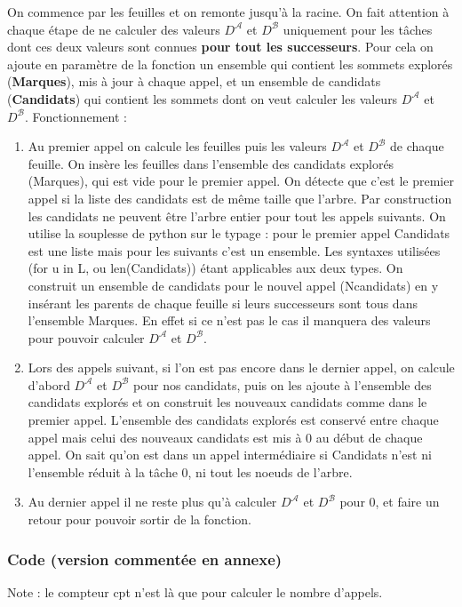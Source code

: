 \documentclass{article}
\begin{document}
On commence par les feuilles et on remonte jusqu'à la racine. On fait attention à chaque étape de ne calculer des valeurs $D^{\mathcal{A}}$ et $D^{\mathcal{B}}$ uniquement pour les tâches dont ces deux valeurs sont connues \textbf{pour tout les successeurs}. Pour cela on ajoute en paramètre de la fonction un ensemble qui contient les sommets explorés (\textbf{Marques}), mis à jour à chaque appel, et un ensemble de candidats (\textbf{Candidats}) qui contient les sommets dont on veut calculer les valeurs $D^{\mathcal{A}}$ et $D^{\mathcal{B}}$. Fonctionnement :
\begin{enumerate}
\item Au premier appel on calcule les feuilles puis les valeurs $D^{\mathcal{A}}$ et $D^{\mathcal{B}}$ de chaque feuille. On insère les feuilles dans l'ensemble des candidats explorés (Marques), qui est vide pour le premier appel. On détecte que c'est le premier appel si la liste des candidats est de même taille que l'arbre. Par construction les candidats ne peuvent être l'arbre entier pour tout les appels suivants. On utilise la souplesse de python sur le typage : pour le premier appel Candidats est une liste mais pour les suivants c'est un ensemble. Les syntaxes utilisées (for u in L, ou len(Candidats)) étant applicables aux deux types.
On construit un ensemble de candidats pour le nouvel appel (Ncandidats) en y insérant les parents de chaque feuille si leurs successeurs sont tous dans l'ensemble Marques. En effet si ce n'est pas le cas il manquera des valeurs pour pouvoir calculer $D^{\mathcal{A}}$ et $D^{\mathcal{B}}$. 
\item Lors des appels suivant, si l'on est pas encore dans le dernier appel, on calcule d'abord $D^{\mathcal{A}}$ et $D^{\mathcal{B}}$ pour nos candidats, puis on les ajoute à l'ensemble des candidats explorés et on construit les nouveaux candidats comme dans le premier appel. L'ensemble des candidats explorés est conservé entre chaque appel mais celui des nouveaux candidats est mis à 0 au début de chaque appel. On sait qu'on est dans un appel intermédiaire si Candidats n'est ni l'ensemble réduit à la tâche 0, ni tout les noeuds de l'arbre.

\item Au dernier appel il ne reste plus qu'à calculer $D^{\mathcal{A}}$ et $D^{\mathcal{B}}$ pour 0, et faire un retour pour pouvoir sortir de la fonction.
\end{enumerate}
\subsubsection{Code (version commentée en annexe)}
Note : le compteur cpt n'est là que pour calculer le nombre d'appels.
\end{document}
